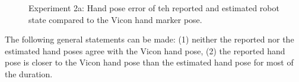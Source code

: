 \begin{figure}[h]
\centering
{}


\caption[Arm movement, hand pose error]{Experiment 2a: Hand pose error of teh reported and estimated robot state compared to the Vicon hand marker pose.}
\label{fig:vic_error_arm_movement}
\end{figure}

The following general statements can be made: (1) neither the reported nor the estimated hand poses agree with the Vicon hand pose, (2) the reported hand pose is closer to the Vicon hand pose than the estimated hand pose for most of the duration.


